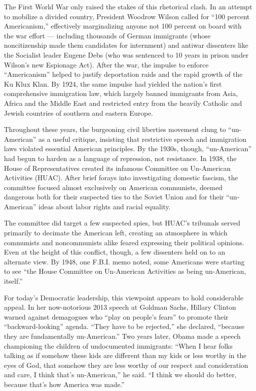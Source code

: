 The First World War only raised the stakes of this rhetorical clash. In
an attempt to mobilize a divided country, President Woodrow Wilson
called for ``100 percent Americanism,'' effectively marginalizing anyone
not 100 percent on board with the war effort --- including thousands of
German immigrants (whose noncitizenship made them candidates for
internment) and antiwar dissenters like the Socialist leader Eugene Debs
(who was sentenced to 10 years in prison under Wilson's new Espionage
Act). After the war, the impulse to enforce ``Americanism'' helped to
justify deportation raids and the rapid growth of the Ku Klux Klan. By
1924, the same impulse had yielded the nation's first comprehensive
immigration law, which largely banned immigrants from Asia, Africa and
the Middle East and restricted entry from the heavily Catholic and
Jewish countries of southern and eastern Europe.

Throughout these years, the burgeoning civil liberties movement clung to
``un-American'' as a useful critique, insisting that restrictive speech
and immigration laws violated essential American principles. By the
1930s, though, ``un-American'' had begun to harden as a language of
repression, not resistance. In 1938, the House of Representatives
created its infamous Committee on Un-American Activities (HUAC). After
brief forays into investigating domestic fascism, the committee focused
almost exclusively on American communists, deemed dangerous both for
their suspected ties to the Soviet Union and for their ``un-American''
ideas about labor rights and racial equality.

The committee did target a few suspected spies, but HUAC's tribunals
served primarily to decimate the American left, creating an atmosphere
in which communists and noncommunists alike feared expressing their
political opinions. Even at the height of this conflict, though, a few
dissenters held on to an alternate view. By 1948, one F.B.I. memo noted,
some Americans were starting to see ``the House Committee on Un-American
Activities as being un-American, itself.''

For today's Democratic leadership, this viewpoint appears to hold
considerable appeal. In her now-notorious 2013 speech at Goldman Sachs,
Hillary Clinton warned against demagogues who ``play on people's fears''
to promote their ``backward-looking'' agenda. ``They have to be
rejected,'' she declared, ``because they are fundamentally
un-American.'' Two years later, Obama made a speech championing the
children of undocumented immigrants: ``When I hear folks talking as if
somehow these kids are different than my kids or less worthy in the eyes
of God, that somehow they are less worthy of our respect and
consideration and care, I think that's un-American,'' he said. ``I think
we should do better, because that's how America was made.''

